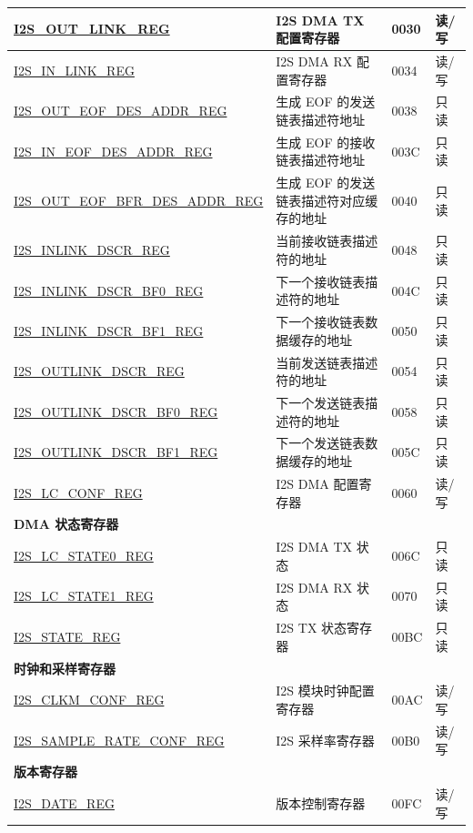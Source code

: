 \begin{longtable}{ | p{6cm} | p{7.2cm} | p{1.3cm} | p{1cm} | }
\hyperref[regdesc:I2SOUTLINKREG]{I2S\_OUT\_LINK\_REG} & I2S DMA TX 配置寄存器 & \hexprefix{}0030 & 读/写 \\ \hline
\hyperref[regdesc:I2SINLINKREG]{I2S\_IN\_LINK\_REG} & I2S DMA RX 配置寄存器 & \hexprefix{}0034 & 读/写 \\ \hline
\hyperref[regdesc:I2SOUTEOFDESADDRREG]{I2S\_OUT\_EOF\_DES\_ADDR\_REG} & 生成 EOF 的发送链表描述符地址 & \hexprefix{}0038 & 只读 \\ \hline
\hyperref[regdesc:I2SINEOFDESADDRREG]{I2S\_IN\_EOF\_DES\_ADDR\_REG} & 生成 EOF 的接收链表描述符地址 & \hexprefix{}003C & 只读 \\ \hline
\hyperref[regdesc:I2SOUTEOFBFRDESADDRREG]{I2S\_OUT\_EOF\_BFR\_DES\_ADDR\_REG} & 生成 EOF 的发送链表描述符对应缓存的地址 & \hexprefix{}0040 & 只读 \\ \hline
\hyperref[regdesc:I2SINLINKDSCRREG]{I2S\_INLINK\_DSCR\_REG} & 当前接收链表描述符的地址 & \hexprefix{}0048 & 只读 \\ \hline
\hyperref[regdesc:I2SINLINKDSCRBF0REG]{I2S\_INLINK\_DSCR\_BF0\_REG} & 下一个接收链表描述符的地址 & \hexprefix{}004C & 只读 \\ \hline
\hyperref[regdesc:I2SINLINKDSCRBF1REG]{I2S\_INLINK\_DSCR\_BF1\_REG} & 下一个接收链表数据缓存的地址 & \hexprefix{}0050 & 只读 \\ \hline
\hyperref[regdesc:I2SOUTLINKDSCRREG]{I2S\_OUTLINK\_DSCR\_REG} & 当前发送链表描述符的地址 & \hexprefix{}0054 & 只读 \\ \hline
\hyperref[regdesc:I2SOUTLINKDSCRBF0REG]{I2S\_OUTLINK\_DSCR\_BF0\_REG} & 下一个发送链表描述符的地址 & \hexprefix{}0058 & 只读 \\ \hline
\hyperref[regdesc:I2SOUTLINKDSCRBF1REG]{I2S\_OUTLINK\_DSCR\_BF1\_REG} & 下一个发送链表数据缓存的地址 & \hexprefix{}005C & 只读 \\ \hline
\hyperref[regdesc:I2SLCCONFREG]{I2S\_LC\_CONF\_REG} & I2S DMA 配置寄存器 & \hexprefix{}0060 & 读/写 \\ \hline
\multicolumn{4}{|l|}{\textbf{DMA 状态寄存器}} \\ \hline
\hyperref[regdesc:I2SLCSTATE0REG]{I2S\_LC\_STATE0\_REG} & I2S DMA TX 状态 & \hexprefix{}006C & 只读 \\ \hline
\hyperref[regdesc:I2SLCSTATE1REG]{I2S\_LC\_STATE1\_REG} & I2S DMA RX 状态 & \hexprefix{}0070 & 只读 \\ \hline
\hyperref[regdesc:I2SSTATEREG]{I2S\_STATE\_REG} & I2S TX 状态寄存器 & \hexprefix{}00BC & 只读 \\ \hline
\multicolumn{4}{|l|}{\textbf{时钟和采样寄存器}} \\ \hline
\hyperref[regdesc:I2SCLKMCONFREG]{I2S\_CLKM\_CONF\_REG} & I2S 模块时钟配置寄存器 & \hexprefix{}00AC & 读/写 \\ \hline
\hyperref[regdesc:I2SSAMPLERATECONFREG]{I2S\_SAMPLE\_RATE\_CONF\_REG} & I2S 采样率寄存器 & \hexprefix{}00B0 & 读/写 \\ \hline
\multicolumn{4}{|l|}{\textbf{版本寄存器}} \\ \hline
\hyperref[regdesc:I2SDATEREG]{I2S\_DATE\_REG} & 版本控制寄存器 & \hexprefix{}00FC & 读/写 \\ \hline
\end{longtable}
